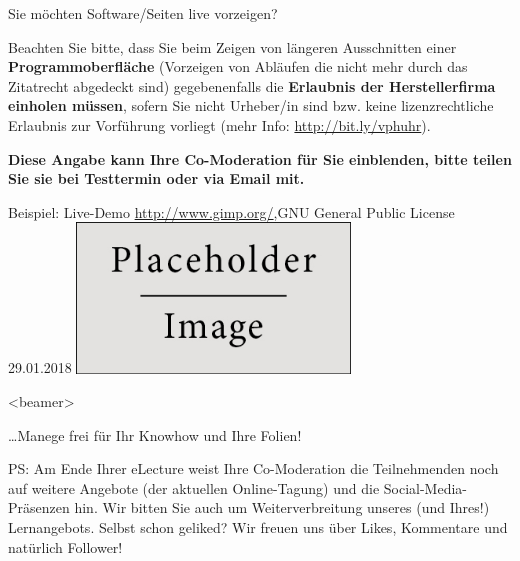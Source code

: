 \documentclass{beamer}
\begin{document}
\begin{frame}{Sie möchten Software/Seiten live vorzeigen?}
	\scriptsize
	\setlength{\parskip}{0.75\baselineskip}

	Beachten Sie bitte, dass Sie beim Zeigen von längeren Ausschnitten einer \textbf{Programmoberfläche} (Vorzeigen von Abläufen die nicht mehr durch das Zitatrecht abgedeckt sind) gegebenenfalls die \textbf{Erlaubnis der Herstellerfirma einholen müssen}, sofern Sie nicht Urheber/in sind bzw. keine lizenzrechtliche Erlaubnis zur Vorführung vorliegt (mehr Info: \url{http://bit.ly/vphuhr}).

	\textbf{Diese Angabe kann Ihre Co-Moderation für Sie einblenden, bitte teilen Sie sie bei Testtermin oder via Email mit.}

	\begin{block}{\scriptsize Beispiel: Live-Demo \href{GIMP}{http://www.gimp.org/},GNU General Public License 29.01.2018}
		\centering
		\includegraphics[height=4cm]{figures/placeholder}
	\end{block}
\end{frame}


\miniframesoff
\begin{frame}<beamer>{}
	\begin{center}
		\ldots Manege frei für Ihr Knowhow und Ihre Folien!
	\end{center}
	\vspace{3cm}
	\tiny
	PS: Am Ende Ihrer eLecture weist Ihre Co-Moderation die Teilnehmenden noch auf weitere Angebote (\zB der aktuellen Online-Tagung) und die Social-Media-Präsenzen hin. Wir bitten Sie auch um Weiterverbreitung unseres (und Ihres!) Lernangebots. Selbst schon geliked? Wir freuen uns über Likes, Kommentare und natürlich Follower!
\end{frame}
\end{document}

